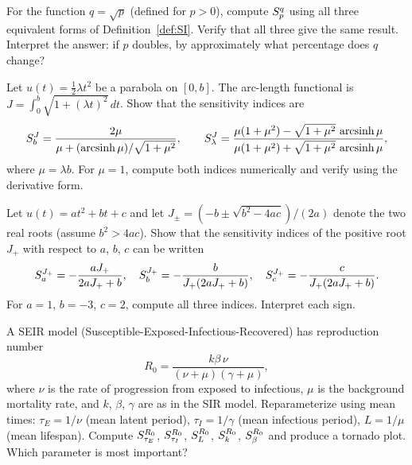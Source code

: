 \begin{exercise}[\bloom{L2}]
\label{ex:ch2:threeforms}
For the function $q = \sqrt{p}$ (defined for $p > 0$), compute
$S_{p}^{q}$ using all three equivalent forms of Definition~\ref{def:SI}.
Verify that all three give the same result. Interpret the answer:
if $p$ doubles, by approximately what percentage does $q$ change?
\end{exercise}

\begin{exercise}[\bloom{L3}]
\label{ex:ch2:arcparabola}
Let $u(t) = \frac{1}{2}\lambda t^2$ be a parabola on $[0, b]$.
The arc-length functional is $J = \int_0^b \sqrt{1 + (\lambda t)^2}\,dt$.
Show that the sensitivity indices are
\[
  S_{b}^{J} = \frac{2\mu}{\mu + (\operatorname{arcsinh}\mu)/\sqrt{1+\mu^2}},
  \qquad
  S_{\lambda}^{J} = \frac{\mu(1+\mu^2) - \sqrt{1+\mu^2}\,\operatorname{arcsinh}\mu}
                        {\mu(1+\mu^2) + \sqrt{1+\mu^2}\,\operatorname{arcsinh}\mu},
\]
where $\mu = \lambda b$. For $\mu = 1$, compute both indices numerically
and verify using the derivative form.
\end{exercise}

\begin{exercise}[\bloom{L3}]
\label{ex:ch2:quadroots}
Let $u(t) = at^2 + bt + c$ and let $J_\pm = (-b \pm \sqrt{b^2 - 4ac})/(2a)$
denote the two real roots (assume $b^2 > 4ac$).
Show that the sensitivity indices of the positive root $J_+$ with respect to
$a$, $b$, $c$ can be written
\[
  S_{a}^{J_+} = -\frac{aJ_+}{2aJ_+ + b},
  \quad
  S_{b}^{J_+} = -\frac{b}{J_+(2aJ_+ + b)},
  \quad
  S_{c}^{J_+} = -\frac{c}{J_+(2aJ_+ + b)}.
\]
For $a=1$, $b=-3$, $c=2$, compute all three indices. Interpret each sign.
\end{exercise}

\begin{exercise}[\bloom{L3}]
\label{ex:ch2:SEIRR0}
A SEIR model (Susceptible-Exposed-Infectious-Recovered) has reproduction
number
\[
  R_0 = \frac{k\beta\,\nu}{(\nu + \mu)(\gamma + \mu)},
\]
where $\nu$ is the rate of progression from exposed to infectious,
$\mu$ is the background mortality rate, and $k$, $\beta$, $\gamma$
are as in the SIR model.
Reparameterize using mean times: $\tau_E = 1/\nu$ (mean latent period),
$\tau_I = 1/\gamma$ (mean infectious period), $L = 1/\mu$ (mean lifespan).
Compute $S_{\tau_E}^{R_0}$, $S_{\tau_I}^{R_0}$, $S_{L}^{R_0}$,
$S_{k}^{R_0}$, $S_{\beta}^{R_0}$ and produce a tornado plot.
Which parameter is most important?
\end{exercise}


